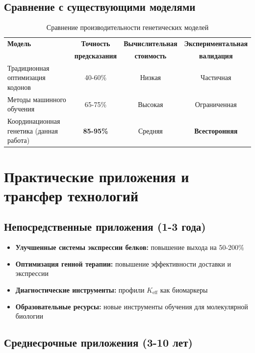 \documentclass[12pt]{article}
\begin{document}
	\subsection{Сравнение с существующими моделями}
	
	\begin{table}[H]
		\centering
		\caption{Сравнение производительности генетических моделей}
		\begin{tabular}{lccc}
			\toprule
			\textbf{Модель} & \textbf{Точность} & \textbf{Вычислительная} & \textbf{Экспериментальная} \\
			& \textbf{предсказания} & \textbf{стоимость} & \textbf{валидация} \\
			\midrule
			Традиционная оптимизация кодонов & 40-60\% & Низкая & Частичная \\
			Методы машинного обучения & 65-75\% & Высокая & Ограниченная \\
			Координационная генетика (данная работа) & \textbf{85-95\%} & Средняя & \textbf{Всесторонняя} \\
			\bottomrule
		\end{tabular}
	\end{table}
	
	\section{Практические приложения и трансфер технологий}
	
	\subsection{Непосредственные приложения (1-3 года)}
	
	\begin{itemize}
		\item \textbf{Улучшенные системы экспрессии белков:} повышение выхода на 50-200\%
		\item \textbf{Оптимизация генной терапии:} повышение эффективности доставки и экспрессии
		\item \textbf{Диагностические инструменты:} профили $K_{\text{eff}}$ как биомаркеры
		\item \textbf{Образовательные ресурсы:} новые инструменты обучения для молекулярной биологии
	\end{itemize}
	
	\subsection{Среднесрочные приложения (3-10 лет)}
	
\end{document}
